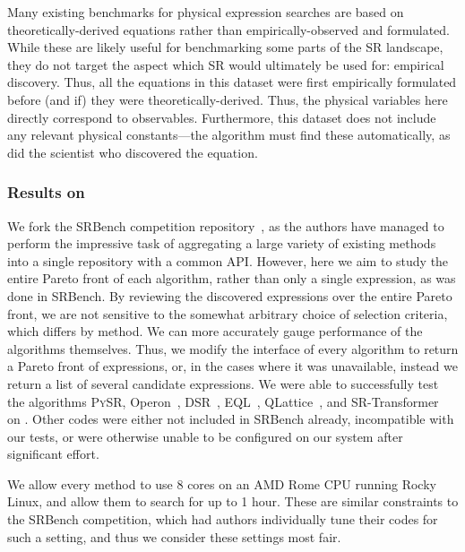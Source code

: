 \documentclass[letterpaper,twocolumn]{scrartcl}
\newcommand\We{We\xspace}
\newcommand\our{our\xspace}
\newcommand\pysr{\textsc{PySR}\xspace}
\newcommand\sr{SR\xspace}
\begin{document}
Many existing benchmarks for physical expression searches are based on theoretically-derived equations rather than empirically-observed and formulated. 
While these are likely useful for benchmarking some parts of the \sr landscape, they do not target the aspect which \sr would ultimately be used for: empirical discovery.
Thus, all the equations in this dataset were first empirically formulated before (and if) they were theoretically-derived.
Thus, the physical variables here directly correspond to observables.
Furthermore, this dataset does not include any relevant physical constants---the algorithm must find these automatically, as did the scientist who discovered the equation.



\subsubsection{Results on \bench}

\We fork the SRBench competition repository~\cite{defrancaInterpretableSymbolicRegression2023}, as the authors have managed to perform the impressive task of aggregating a large variety of existing methods into a single repository with a common API.
However, here we aim to study the entire Pareto front of each algorithm, rather than only a single expression, as was done in SRBench.
By reviewing the discovered expressions over the entire Pareto front, we are not sensitive to the somewhat arbitrary choice of selection criteria, which differs by method. 
We can more accurately gauge performance of the algorithms themselves.
Thus, we modify the interface of every algorithm to return a Pareto front of expressions, or, in the cases where it was unavailable, instead we return a list of several candidate expressions.
\We were able to successfully test the algorithms \pysr, Operon~\cite{burlacuOperonEfficientGenetic2020}, DSR~\cite{petersenDeepSymbolicRegression2021}, EQL~\cite{sahooLearningEquationsExtrapolation2018}, QLattice~\cite{brolosApproachSymbolicRegression2021}, and SR-Transformer~\cite{kamiennyEndtoendSymbolicRegression2022} on \bench.
Other codes were either not included in SRBench already, incompatible with our tests, or were otherwise unable to be configured on \our system after significant effort.

We allow every method to use 8 cores on an AMD Rome CPU running Rocky Linux, and allow them to search for up to 1 hour.
These are similar constraints to the SRBench competition, which had authors individually tune their codes for such a setting, and thus we consider these settings most fair.
\end{document}
